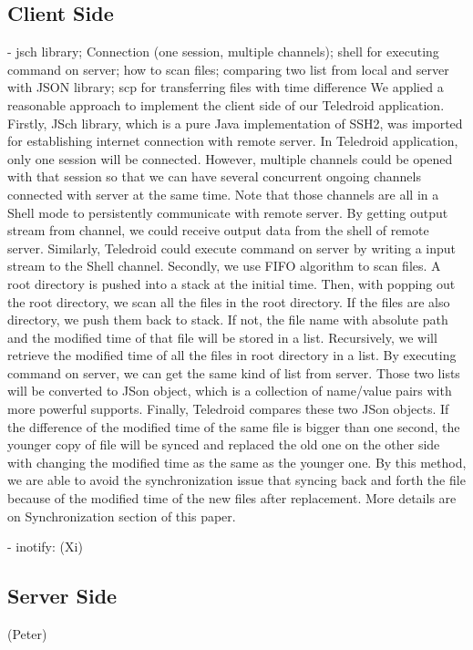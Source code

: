\subsection{Client Side}
		- jsch library; Connection (one session, multiple channels); shell for executing command on server; how to scan files;  comparing two list from local and server with JSON library; scp for transferring files with time difference
		We applied a reasonable approach to implement the client side of our Teledroid application. Firstly, JSch library, which is a pure Java implementation of SSH2, was imported for establishing internet connection with remote server. In Teledroid application, only one session will be connected. However, multiple channels could be opened with that session so that we can have several concurrent ongoing channels connected with server at the same time. Note that those channels are all in a Shell mode to persistently communicate with remote server. By getting output stream from channel, we could receive output data from the shell of remote server. Similarly, Teledroid could execute command on server by writing a input stream to the Shell channel. Secondly, we use FIFO algorithm to scan files. A root directory is pushed into a stack at the initial time. Then, with popping out the root directory, we scan all the files in the root directory. If the files are also directory, we push them back to stack. If not, the file name with absolute path and the modified time of that file will be stored in a list. Recursively, we will retrieve the modified time of all the files in root directory in a list. By executing command on server, we can get the same kind of list from server. Those two lists will be converted to JSon object, which is a collection of name/value pairs with more powerful supports. Finally, Teledroid compares these two JSon objects. If the difference of the modified time of the same file is bigger than one second, the younger copy of file will be synced and replaced the old one on the other side with changing the modified time as the same as the younger one. By this method, we are able to avoid the synchronization issue that syncing back and forth the file because of the modified time of the new files after replacement. More details are on Synchronization section of this paper.

		- inotify: (Xi)

\subsection{Server Side}
(Peter)